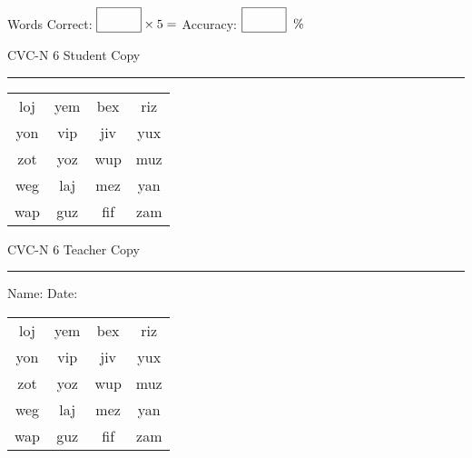 \documentclass{memoir}
\begin{document}
\small

Words Correct: $\fbox{\phantom{\huge 100}} \times 5 = $ Accuracy: $\fbox{\phantom{\huge 100}}\;\; \%$ 

\vfill

\newpage


\footnotesize \noindent
CVC-N 6 \hfill Student Copy
\smallskip
\hrule

\Large

\setlength{\tabcolsep}{14pt}
\def\arraystretch{2}

{\selectfont


\begin{vplace}[0.5]
\begin{center}
\begin{tabular}{cccc}
loj & yem & bex & riz \\
yon & vip & jiv & yux \\
zot & yoz & wup & muz \\
weg & laj & mez & yan \\
wap & guz & fif & zam \\
\end{tabular}
\end{center}
\end{vplace}

}

\newpage

\footnotesize \noindent
CVC-N 6 \hfill Teacher Copy
\smallskip
\hrule

\small

\vfill

\noindent
Name: \underline{\hspace{1.75in}} \hfill Date: \underline{\hspace{1in}}

\Large

{\selectfont


\begin{vplace}[0.5]
\begin{center}
\begin{tabular}{cccc}
loj & yem & bex & riz \\
yon & vip & jiv & yux \\
zot & yoz & wup & muz \\
weg & laj & mez & yan \\
wap & guz & fif & zam \\
\end{tabular}
\end{center}
\end{vplace}



}
\end{document}
